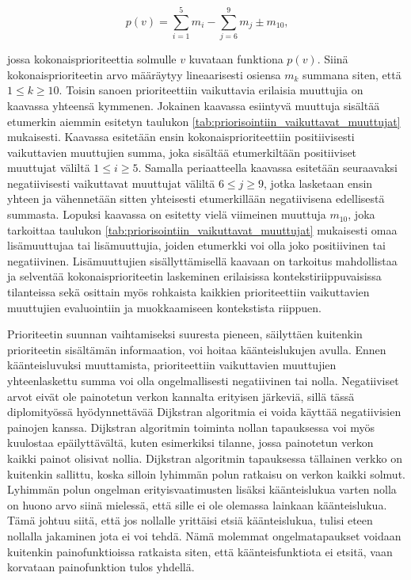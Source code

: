   \begin{equation} \label{eq:5_4_1}
    p(v) = \sum\limits_{i=1}^{5} m_i - \sum\limits_{j=6}^{9} m_j \pm m_{10}\text{,}
  \end{equation}

  jossa kokonaisprioriteettia solmulle \(v\) kuvataan funktiona \(p(v)\). Siinä kokonaisprioriteetin arvo määräytyy lineaarisesti osiensa \(m_k\) summana siten, että \(1 \leq k \geq 10\).
  Toisin sanoen prioriteettiin vaikuttavia erilaisia muuttujia on kaavassa yhteensä kymmenen.
  Jokainen kaavassa esiintyvä muuttuja sisältää etumerkin aiemmin esitetyn taulukon \ref{tab:priorisointiin_vaikuttavat_muuttujat} mukaisesti.
  Kaavassa esitetään ensin kokonaisprioriteettiin positiivisesti vaikuttavien muuttujien summa, joka sisältää etumerkiltään positiiviset muuttujat väliltä \(1 \leq i \geq 5\).
  Samalla periaatteella kaavassa esitetään seuraavaksi negatiivisesti vaikuttavat muuttujat väliltä \(6 \leq j \geq 9\), jotka lasketaan ensin yhteen ja vähennetään sitten yhteisesti etumerkillään negatiivisena edellisestä summasta.
  Lopuksi kaavassa on esitetty vielä viimeinen muuttuja \(m_{10}\), joka tarkoittaa taulukon \ref{tab:priorisointiin_vaikuttavat_muuttujat} mukaisesti omaa lisämuuttujaa tai lisämuuttujia, joiden etumerkki voi olla joko positiivinen tai negatiivinen.
  Lisämuuttujien sisällyttämisellä kaavaan on tarkoitus mahdollistaa ja selventää kokonaisprioriteetin laskeminen erilaisissa kontekstiriippuvaisissa tilanteissa sekä osittain myös rohkaista kaikkien prioriteettiin vaikuttavien muuttujien evaluointiin ja muokkaamiseen kontekstista riippuen.

  Prioriteetin suunnan vaihtamiseksi suuresta pieneen, säilyttäen kuitenkin prioriteetin sisältämän informaation, voi hoitaa käänteislukujen avulla.
  Ennen käänteisluvuksi muuttamista, prioriteettiin vaikuttavien muuttujien yhteenlaskettu summa voi olla ongelmallisesti negatiivinen tai nolla.
  Negatiiviset arvot eivät ole painotetun verkon kannalta erityisen järkeviä, sillä tässä diplomityössä hyödynnettävää Dijkstran algoritmia ei voida käyttää negatiivisien painojen kanssa.
  Dijkstran algoritmin toiminta nollan tapauksessa voi myös kuulostaa epäilyttävältä, kuten esimerkiksi tilanne, jossa painotetun verkon kaikki painot olisivat nollia.
  Dijkstran algoritmin tapauksessa tällainen verkko on kuitenkin sallittu, koska silloin lyhimmän polun ratkaisu on verkon kaikki solmut.
  Lyhimmän polun ongelman erityisvaatimusten lisäksi käänteislukua varten nolla on huono arvo siinä mielessä, että sille ei ole olemassa lainkaan käänteislukua.
  Tämä johtuu siitä, että jos nollalle yrittäisi etsiä käänteislukua, tulisi eteen nollalla jakaminen jota ei voi tehdä.
  Nämä molemmat ongelmatapaukset voidaan kuitenkin painofunktioissa ratkaista siten, että käänteisfunktiota ei etsitä, vaan korvataan painofunktion tulos yhdellä.

